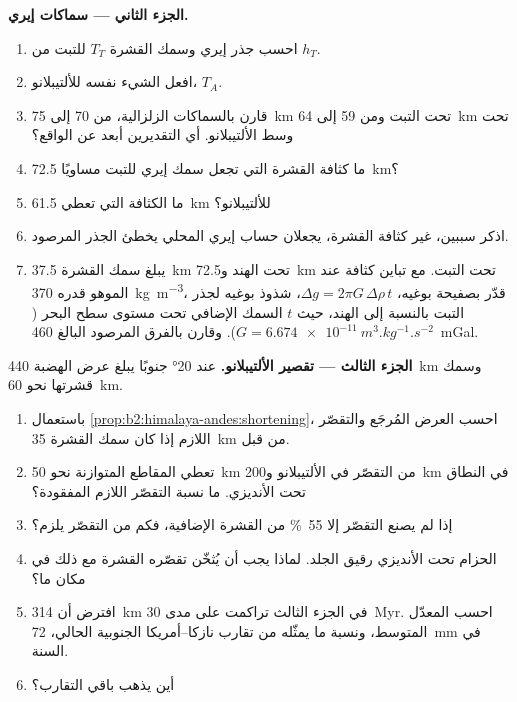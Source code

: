 \begin{problem}
\noindent\textbf{الجزء الثاني --- سماكات إيري.}
\begin{enumerate}[resume]
\item احسب جذر إيري وسمك القشرة $T_T$ للتبت من $h_T$.
\item افعل الشيء نفسه للألتيبلانو، $T_A$.
\item قارن بالسماكات الزلزالية، من 70 إلى \qty{75}{km} تحت التبت ومن 59 إلى
\qty{64}{km} تحت وسط الألتيبلانو. أي التقديرين أبعد عن الواقع؟
\item ما كثافة القشرة التي تجعل سمك إيري للتبت مساويًا \qty{72.5}{km}؟
\item ما الكثافة التي تعطي \qty{61.5}{km} للألتيبلانو؟
\item اذكر سببين، غير كثافة القشرة، يجعلان حساب إيري المحلي
يخطئ الجذر المرصود.
\item يبلغ سمك القشرة \qty{37.5}{km} تحت الهند و\qty{72.5}{km} تحت التبت. مع
تباين كثافة عند الموهو قدره \qty{370}{kg.m^{-3}}، قدّر بصفيحة بوغيه، $\Delta g
= 2\pi G\,\Delta\rho\,t$، شذوذ بوغيه لجذر التبت بالنسبة إلى الهند، حيث $t$
السمك الإضافي تحت مستوى سطح البحر ($G = \qty{6.674e-11}{m^3.kg^{-1}.s^{-2}}$). وقارن بالفرق
المرصود البالغ \qty{460}{mGal}.
\end{enumerate}

\noindent\textbf{الجزء الثالث --- تقصير الألتيبلانو.} عند \ang{20} جنوبًا يبلغ عرض الهضبة
\qty{440}{km} وسمك قشرتها نحو \qty{60}{km}.
\begin{enumerate}[resume]
\item باستعمال \cref{prop:b2:himalaya-andes:shortening}، احسب العرض المُرجَع
والتقصّر اللازم إذا كان سمك القشرة \qty{35}{km} من قبل.
\item تعطي المقاطع المتوازنة نحو \qty{50}{km} من التقصّر في الألتيبلانو
و\qty{200}{km} في النطاق تحت الأنديزي. ما نسبة التقصّر اللازم المفقودة؟
\item إذا لم يصنع التقصّر إلا \qty{55}{\percent} من القشرة الإضافية، فكم من التقصّر
يلزم؟
\item الحزام تحت الأنديزي رقيق الجلد. لماذا يجب أن يُثخّن تقصّره القشرة مع ذلك
في مكان ما؟
\item افترض أن \qty{314}{km} في الجزء الثالث تراكمت على مدى \qty{30}{Myr}. احسب المعدّل
المتوسط، ونسبة ما يمثّله من تقارب نازكا--أمريكا الجنوبية الحالي، \qty{72}{mm} في السنة.
\item أين يذهب باقي التقارب؟
\end{enumerate}


\end{problem}
